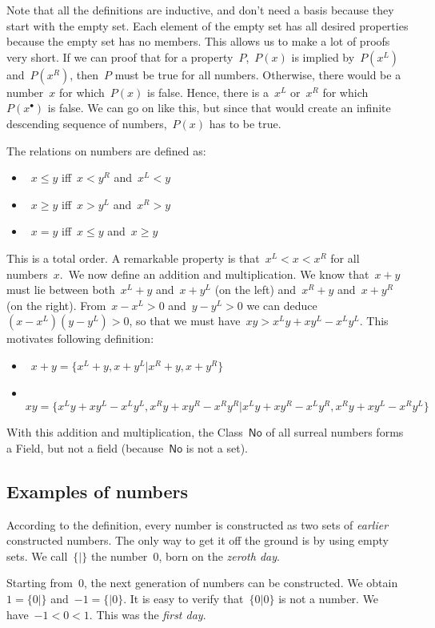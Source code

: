 Note that all the definitions are inductive, and don't need a basis because they start with the empty set. Each element of the empty set has all desired properties because the empty set has no members. This allows us to make a lot of proofs very short. If we can proof that for a property~$P$,~$P(x)$ is implied by~$P(x^L)$ and~$P(x^R)$, then~$P$ must be true for all numbers. Otherwise, there would be a number~$x$ for which~$P(x)$ is false. Hence, there is a~$x^L$ or~$x^R$ for which~$P(x^\bullet)$ is false. We can go on like this, but since that would create an infinite descending sequence of numbers,~$P(x)$ has to be true.

The relations on numbers are defined as:
\begin{itemize}
  \item~$x \leq y$ iff~$x < y^R$ and~$x^L < y$
  \item~$x \geq y$ iff~$x > y^L$ and~$x^R > y$
  \item~$x = y$ iff~$x \leq y$ and~$x \geq y$
\end{itemize}

This is a total order. A remarkable property is that~$x^L < x < x^R$ for all numbers~$x$. We now define an addition and multiplication. We know that~$x + y$ must lie between both~$x^L + y$ and~$x + y^L$ (on the left) and~$x^R + y$ and~$x + y^R$ (on the right). From~$x - x^L > 0$ and~$y - y^L > 0$ we can deduce~$(x - x^L)(y - y^L) > 0$, so that we must have~$xy > x^Ly + xy^L - x^Ly^L$. This motivates following definition:
\begin{itemize}
  \item~$x + y = \{x^L + y, x + y^L \vert x^R + y, x + y^R \}$
  \item~$xy = \{ x^Ly + xy^L - x^Ly^L, x^Ry + xy^R - x^Ry^R \vert x^Ly + xy^R - x^Ly^R, x^Ry + xy^L - x^Ry^L \}$
\end{itemize}
With this addition and multiplication, the Class~$\textsf{No}$ of all surreal numbers forms a Field, but not a field (because~$\textsf{No}$ is not a set).

\subsection{Examples of numbers}
According to the definition, every number is constructed as two sets of \emph{earlier} constructed numbers. The only way to get it off the ground is by using empty sets. We call~$\{ \vert \}$ the number~$0$, born on the \emph{zeroth day}.

Starting from~$0$, the next generation of numbers can be constructed. We obtain~$1 = \{ 0 \vert \}$ and~$-1 = \{ \vert 0 \}$. It is easy to verify that~$\{ 0 \vert 0 \}$ is not a number. We have~$-1 < 0 < 1$. This was the \emph{first day}.

